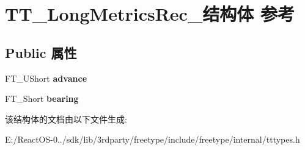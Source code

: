 \hypertarget{struct_t_t___long_metrics_rec__}{}\section{T\+T\+\_\+\+Long\+Metrics\+Rec\+\_\+结构体 参考}
\label{struct_t_t___long_metrics_rec__}
\subsection*{Public 属性}
\begin{DoxyCompactItemize}
\item 
\mbox{\label{struct_t_t___long_metrics_rec___a47100e42b52486bc374f80ed2795361d}} 
F\+T\+\_\+\+U\+Short {\bfseries advance}
\item 
\mbox{\label{struct_t_t___long_metrics_rec___a0d74e3eb8611b0a5e89e338af35be4da}} 
F\+T\+\_\+\+Short {\bfseries bearing}
\end{DoxyCompactItemize}


该结构体的文档由以下文件生成\+:\begin{DoxyCompactItemize}
\item 
E\+:/\+React\+O\+S-\/0../sdk/lib/3rdparty/freetype/include/freetype/internal/tttypes.\+h\end{DoxyCompactItemize}
